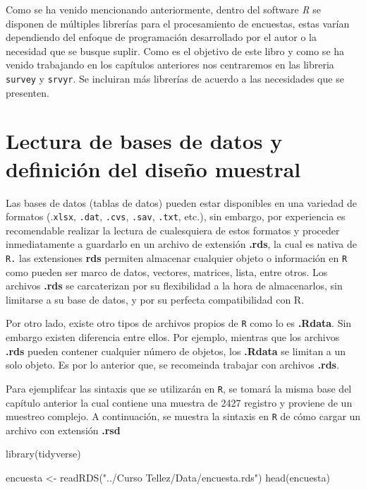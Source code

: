 \documentclass[
  12pt,
]{book}
\newenvironment{Shaded}{\begin{snugshade}}{\end{snugshade}}
\newcommand{\FunctionTok}[1]{\textcolor[rgb]{0.00,0.00,0.00}{#1}}
\newcommand{\NormalTok}[1]{#1}
\newcommand{\OtherTok}[1]{\textcolor[rgb]{0.56,0.35,0.01}{#1}}
\newcommand{\StringTok}[1]{\textcolor[rgb]{0.31,0.60,0.02}{#1}}
\begin{document}
Como se ha venido mencionando anteriormente, dentro del software \emph{R} se disponen de múltiples librerías para el procesamiento de encuestas, estas varían dependiendo del enfoque de programación desarrollado por el autor o la necesidad que se busque suplir. Como es el objetivo de este libro y como se ha venido trabajando en los capítulos anteriores nos centraremos en las libreria \texttt{survey} y \texttt{srvyr}. Se incluiran más librerías de acuerdo a las necesidades que se presenten.

\hypertarget{lectura-de-bases-de-datos-y-definiciuxf3n-del-diseuxf1o-muestral}{%
\section{Lectura de bases de datos y definición del diseño muestral}\label{lectura-de-bases-de-datos-y-definiciuxf3n-del-diseuxf1o-muestral}}

Las bases de datos (tablas de datos) pueden estar disponibles en una variedad de formatos (.\texttt{xlsx}, \texttt{.dat}, \texttt{.cvs}, \texttt{.sav}, \texttt{.txt}, etc.), sin embargo, por experiencia es recomendable realizar la lectura de cualesquiera de estos formatos y proceder inmediatamente a guardarlo en un archivo de extensión \textbf{.rds}, la cual es nativa de \texttt{R.} las extensiones \textbf{rds} permiten almacenar cualquier objeto o información en \texttt{R} como pueden ser marco de datos, vectores, matrices, lista, entre otros. Los archivos \textbf{.rds} se carcaterizan por su flexibilidad a la hora de almacenarlos, sin limitarse a su base de datos, y por su perfecta compatibilidad con R.

Por otro lado, existe otro tipos de archivos propios de \texttt{R} como lo es \textbf{.Rdata}. Sin embargo existen diferencia entre ellos. Por ejemplo, mientras que los archivos \textbf{.rds} pueden contener cualquier número de objetos, los \textbf{.Rdata} se limitan a un solo objeto. Es por lo anterior que, se recomeinda trabajar con archivos \textbf{.rds}.

Para ejemplifcar las sintaxis que se utilizarán en \texttt{R}, se tomará la misma base del capítulo anterior la cual contiene una muestra de 2427 registro y proviene de un muestreo complejo. A continuación, se muestra la sintaxis en \texttt{R} de cómo cargar un archivo con extensión \textbf{.rsd}

\begin{Shaded}
\begin{Highlighting}[]
\FunctionTok{library}\NormalTok{(tidyverse)}

\NormalTok{encuesta }\OtherTok{\textless{}{-}} \FunctionTok{readRDS}\NormalTok{(}\StringTok{"../Curso Tellez/Data/encuesta.rds"}\NormalTok{)}
\FunctionTok{head}\NormalTok{(encuesta)}
\end{Highlighting}
\end{Shaded}
\end{document}
